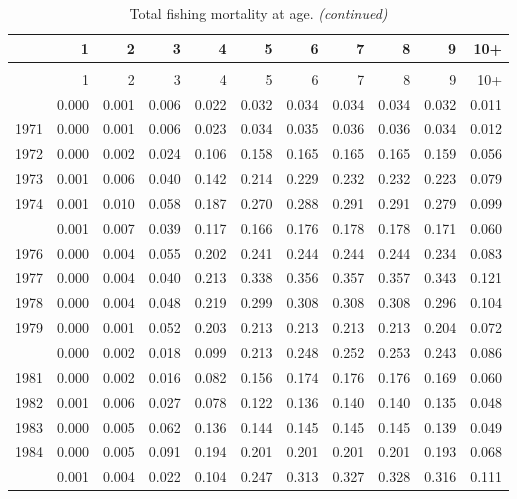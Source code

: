 \documentclass[
]{article}
\begin{document}
\begin{longtable}[t]{lrrrrrrrrrr}
\caption{\label{tab:FAA-tot-table}Total fishing mortality at age.}\\
\toprule
  & 1 & 2 & 3 & 4 & 5 & 6 & 7 & 8 & 9 & 10+\\
\midrule
\endfirsthead
\caption[]{Total fishing mortality at age. \textit{(continued)}}\\
\toprule
  & 1 & 2 & 3 & 4 & 5 & 6 & 7 & 8 & 9 & 10+\\
\midrule
\endhead

\endfoot
\bottomrule
\endlastfoot
1970 & 0.000 & 0.001 & 0.006 & 0.022 & 0.032 & 0.034 & 0.034 & 0.034 & 0.032 & 0.011\\
1971 & 0.000 & 0.001 & 0.006 & 0.023 & 0.034 & 0.035 & 0.036 & 0.036 & 0.034 & 0.012\\
1972 & 0.000 & 0.002 & 0.024 & 0.106 & 0.158 & 0.165 & 0.165 & 0.165 & 0.159 & 0.056\\
1973 & 0.001 & 0.006 & 0.040 & 0.142 & 0.214 & 0.229 & 0.232 & 0.232 & 0.223 & 0.079\\
1974 & 0.001 & 0.010 & 0.058 & 0.187 & 0.270 & 0.288 & 0.291 & 0.291 & 0.279 & 0.099\\
\addlinespace
1975 & 0.001 & 0.007 & 0.039 & 0.117 & 0.166 & 0.176 & 0.178 & 0.178 & 0.171 & 0.060\\
1976 & 0.000 & 0.004 & 0.055 & 0.202 & 0.241 & 0.244 & 0.244 & 0.244 & 0.234 & 0.083\\
1977 & 0.000 & 0.004 & 0.040 & 0.213 & 0.338 & 0.356 & 0.357 & 0.357 & 0.343 & 0.121\\
1978 & 0.000 & 0.004 & 0.048 & 0.219 & 0.299 & 0.308 & 0.308 & 0.308 & 0.296 & 0.104\\
1979 & 0.000 & 0.001 & 0.052 & 0.203 & 0.213 & 0.213 & 0.213 & 0.213 & 0.204 & 0.072\\
\addlinespace
1980 & 0.000 & 0.002 & 0.018 & 0.099 & 0.213 & 0.248 & 0.252 & 0.253 & 0.243 & 0.086\\
1981 & 0.000 & 0.002 & 0.016 & 0.082 & 0.156 & 0.174 & 0.176 & 0.176 & 0.169 & 0.060\\
1982 & 0.001 & 0.006 & 0.027 & 0.078 & 0.122 & 0.136 & 0.140 & 0.140 & 0.135 & 0.048\\
1983 & 0.000 & 0.005 & 0.062 & 0.136 & 0.144 & 0.145 & 0.145 & 0.145 & 0.139 & 0.049\\
1984 & 0.000 & 0.005 & 0.091 & 0.194 & 0.201 & 0.201 & 0.201 & 0.201 & 0.193 & 0.068\\
\addlinespace
1985 & 0.001 & 0.004 & 0.022 & 0.104 & 0.247 & 0.313 & 0.327 & 0.328 & 0.316 & 0.111\\

\end{longtable}
\end{document}
